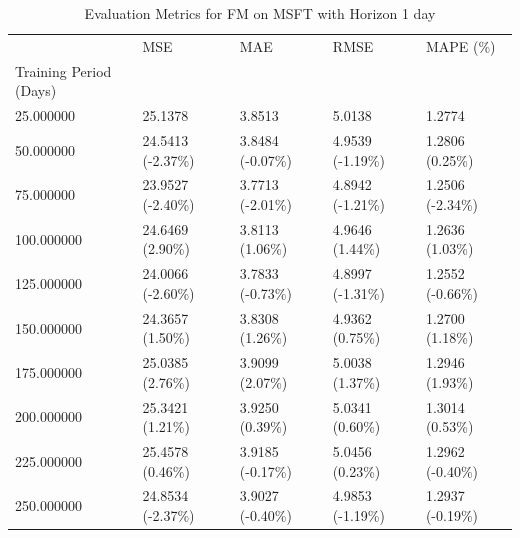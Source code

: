 \begin{table}
\caption{Evaluation Metrics for FM on MSFT with Horizon 1 day}
\label{tab:fm_MSFT_h1_metrics}
\begin{tabular}{lllll}
\toprule
 & MSE & MAE & RMSE & MAPE (\%) \\
Training Period (Days) &  &  &  &  \\
\midrule
25.000000 & 25.1378 & 3.8513 & 5.0138 & 1.2774 \\
50.000000 & 24.5413 (-2.37\%) & 3.8484 (-0.07\%) & 4.9539 (-1.19\%) & 1.2806 (0.25\%) \\
75.000000 & 23.9527 (-2.40\%) & 3.7713 (-2.01\%) & 4.8942 (-1.21\%) & 1.2506 (-2.34\%) \\
100.000000 & 24.6469 (2.90\%) & 3.8113 (1.06\%) & 4.9646 (1.44\%) & 1.2636 (1.03\%) \\
125.000000 & 24.0066 (-2.60\%) & 3.7833 (-0.73\%) & 4.8997 (-1.31\%) & 1.2552 (-0.66\%) \\
150.000000 & 24.3657 (1.50\%) & 3.8308 (1.26\%) & 4.9362 (0.75\%) & 1.2700 (1.18\%) \\
175.000000 & 25.0385 (2.76\%) & 3.9099 (2.07\%) & 5.0038 (1.37\%) & 1.2946 (1.93\%) \\
200.000000 & 25.3421 (1.21\%) & 3.9250 (0.39\%) & 5.0341 (0.60\%) & 1.3014 (0.53\%) \\
225.000000 & 25.4578 (0.46\%) & 3.9185 (-0.17\%) & 5.0456 (0.23\%) & 1.2962 (-0.40\%) \\
250.000000 & 24.8534 (-2.37\%) & 3.9027 (-0.40\%) & 4.9853 (-1.19\%) & 1.2937 (-0.19\%) \\
\bottomrule
\end{tabular}
\end{table}
